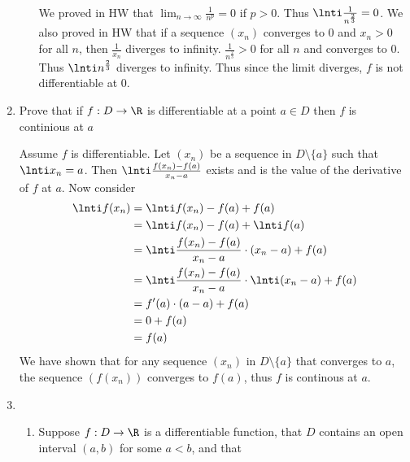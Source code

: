 \documentclass[11pt]{exam}
\begin{document}
\begin{enumerate}
\begin{solution}
\begin{enumerate}
\begin{align*}
                        \end{align*}
                        We proved in HW that $\lim_{n \to \infty} \frac{1}{n^p} = 0$ if $p > 0$. Thus $\lnti \frac{1}{n^{\frac{2}{3}}} = 0$. We 
                        also proved in HW that if a sequence $(x_n)$ converges to 0 and $x_n > 0$ for all $n$, then $\frac{1}{x_n}$ diverges to 
                        infinity. $\frac{1}{n^{\frac{2}{3}}} > 0$ for all $n$ and converges to $0$. Thus $\lnti n^{\frac{2}{3}}$ diverges to 
                        infinity. Thus since the limit diverges, $f$ is not differentiable at 0.
                    \end{enumerate}
                \end{solution}
            \break
        \item Prove that if $f: D \to \R$ is differentiable at a point $a \in D$ then $f$ is continious at $a$
            \begin{solution}
                Assume $f$ is differentiable. Let $(x_n)$ be a sequence in $D \setminus \{a\}$ such 
                that $\lnti x_n = a$. Then $\lnti \frac{f(x_n) - f(a)}{x_n - a}$ exists and is the 
                value of the derivative of $f$ at $a$. Now consider
                \begin{align*}
                    \lnti f(x_n) &= \lnti f(x_n) - f(a) + f(a) \\
                                &= \lnti f(x_n) - f(a) + \lnti f(a) \\
                                &= \lnti \frac{f(x_n) - f(a)}{x_n - a} \cdot (x_n -a) + f(a) \\
                                &= \lnti \frac{f(x_n) - f(a)}{x_n - a} \cdot \lnti (x_n -a) +  f(a) \\
                                &= f'(a) \cdot (a-a) + f(a) \\
                                &= 0 + f(a) \\
                                &= f(a)
                \end{align*}
                We have shown that for any sequence $(x_n)$ in $D \setminus \{a\}$ that converges 
                to $a$, the sequence $(f(x_n))$ converges to $f(a)$, thus $f$ is continous at $a$.
            \end{solution}
        \item 
            \begin{enumerate}
                \item Suppose $f: D \to \R$ is a differentiable function, that $D$ contains an open interval $(a, b)$ for some $a < b$, and that 

\end{enumerate}
\end{enumerate}
\end{document}
